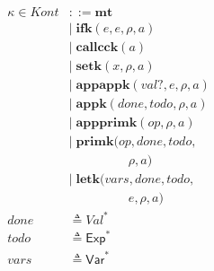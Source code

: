 \documentclass[12pt,draft]{article}
\begin{document}
{\begin{multicols*}{2}
\begin{center}
\begin{align*}
\kappa \in \textit{Kont} &::= \textbf{mt} \\
        &|\; \textbf{ifk}(e, e, \rho, a) \\
        &|\; \textbf{callcck}(a) \\
        &|\; \textbf{setk}(x, \rho, a) \\
        &|\; \textbf{appappk}(val?, e, \rho, a) \\
        &|\; \textbf{appk}(done, todo, \rho, a) \\
        &|\; \textbf{appprimk}(op, \rho, a) \\
        &|\; \textbf{primk}(op, done, todo, \\
        &\;\;\;\;\;\;\;\;\;\;\;\;\;\;\;\;\;\rho, a) \\
        &|\; \textbf{letk}(vars, done, todo, \\
        &\;\;\;\;\;\;\;\;\;\;\;\;\;\;\;\;\;e, \rho, a) \\
done &\triangleq \textit{Val}^\ast \\
todo &\triangleq \textsf{Exp}^* \\
vars &\triangleq \textsf{Var}^*
\end{align*}
\end{center}
\end{multicols*}
}

\newpage
\end{document}
